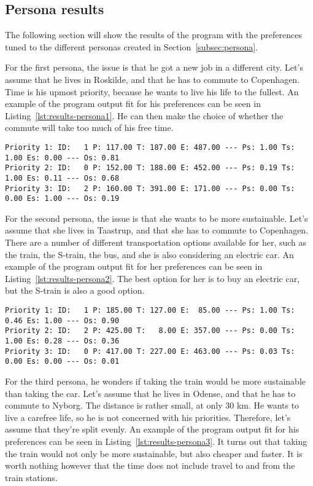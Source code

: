 \subsection{Persona results}\label{subsec:persona-results}

The following section will show the results of the program with the preferences tuned to the different personas created
in Section~\ref{subsec:persona}.

For the first persona, the issue is that he got a new job in a different city.
Let's assume that he lives in Roskilde, and that he has to commute to Copenhagen.
Time is his upmost priority, because he wants to live his life to the fullest.
An example of the program output fit for his preferences can be seen in Listing~\ref{lst:results-persona1}.
He can then make the choice of whether the commute will take too much of his free time.

\begin{lstlisting}[label={lst:results-persona1}, caption={Output for Asger Johansen.}, captionpos=b, language={}]
Priority 1: ID:   1 P: 117.00 T: 187.00 E: 487.00 --- Ps: 1.00 Ts: 1.00 Es: 0.00 --- Os: 0.81
Priority 2: ID:   0 P: 152.00 T: 188.00 E: 452.00 --- Ps: 0.19 Ts: 1.00 Es: 0.11 --- Os: 0.68
Priority 3: ID:   2 P: 160.00 T: 391.00 E: 171.00 --- Ps: 0.00 Ts: 0.00 Es: 1.00 --- Os: 0.19
\end{lstlisting}

For the second persona, the issue is that she wants to be more sustainable.
Let's assume that she lives in Taastrup, and that she has to commute to Copenhagen.
There are a number of different transportation options available for her, such as the train, the S-train, the bus, and
she is also considering an electric car.
An example of the program output fit for her preferences can be seen in Listing~\ref{lst:results-persona2}.
The best option for her is to buy an electric car, but the S-train is also a good option.

\begin{lstlisting}[label={lst:results-persona2}, caption={Output for Josefine Madsen.}, captionpos=b, language={}]
Priority 1: ID:   1 P: 185.00 T: 127.00 E:  85.00 --- Ps: 1.00 Ts: 0.46 Es: 1.00 --- Os: 0.90
Priority 2: ID:   2 P: 425.00 T:   8.00 E: 357.00 --- Ps: 0.00 Ts: 1.00 Es: 0.28 --- Os: 0.36
Priority 3: ID:   0 P: 417.00 T: 227.00 E: 463.00 --- Ps: 0.03 Ts: 0.00 Es: 0.00 --- Os: 0.01
\end{lstlisting}

For the third persona, he wonders if taking the train would be more sustainable than taking the car.
Let's assume that he lives in Odense, and that he has to commute to Nyborg.
The distance is rather small, at only 30 km.
He wants to live a carefree life, so he is not concerned with his priorities.
Therefore, let's assume that they're split evenly.
An example of the program output fit for his preferences can be seen in Listing~\ref{lst:results-persona3}.
It turns out that taking the train would not only be more sustainable, but also cheaper and faster.
It is worth nothing however that the time does not include travel to and from the train stations.

